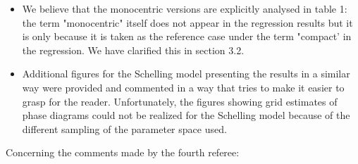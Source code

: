 \documentclass[11pt,a4paper,sans]{moderncv}        %
\begin{document}
\begin{itemize}
	\item We believe that the monocentric versions are explicitly analysed in table 1: the term "monocentric" itself does not appear in the regression results but it is only because it is taken as the reference case under the term "compact' in the regression. We have clarified this in section 3.2.
	
	\item Additional figures for the Schelling model presenting the results in a similar way were provided and commented in a way that tries to make it easier to grasp for the reader. Unfortunately, the figures showing grid estimates of phase diagrams could not be realized for the Schelling model because of the different sampling of the parameter space used.

\end{itemize}



 
Concerning the comments made by the fourth referee:
\end{document}
